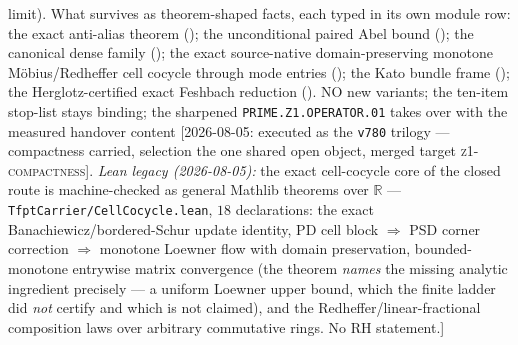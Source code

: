 {{limit).  What survives as theorem-shaped facts, each typed in its
own module row: the exact anti-alias theorem
(); the unconditional paired Abel
bound (); the canonical dense
family (); the exact
source-native domain-preserving monotone M\"obius/Redheffer cell
cocycle through mode entries ();
the Kato bundle frame (); the
Herglotz-certified exact Feshbach reduction
().  NO new variants; the
ten-item stop-list stays binding; the sharpened
\texttt{PRIME.Z1.OPERATOR.01} takes over with the measured
handover content [2026-08-05: executed as the \texttt{v780}
trilogy --- compactness carried, selection the one shared open
object, merged target \textsc{z1-compactness}].  \emph{Lean legacy
(2026-08-05):} the exact cell-cocycle core of the closed route is
machine-checked as general Mathlib theorems over $\mathbb R$ ---
\texttt{TfptCarrier/CellCocycle.lean}, $18$ declarations: the
exact Banachiewicz/bordered-Schur update identity, PD cell block
$\Rightarrow$ PSD corner correction $\Rightarrow$ monotone Loewner
flow with domain preservation, bounded-monotone entrywise matrix
convergence (the theorem \emph{names} the missing analytic
ingredient precisely --- a uniform Loewner upper bound, which the
finite ladder did \emph{not} certify and which is not claimed),
and the Redheffer/linear-fractional composition laws over
arbitrary commutative rings.  No RH statement.]}\par}


